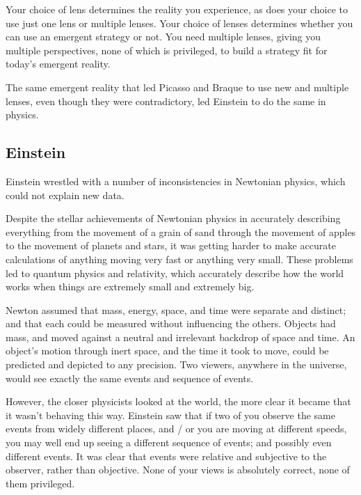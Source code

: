 Your choice of lens determines the reality you experience, as does your choice to use just one lens or multiple lenses. Your choice of lenses determines whether you can use an emergent strategy or not. You need multiple lenses, giving you multiple perspectives, none of which is privileged, to build a strategy fit for today's emergent reality.


The same emergent reality that led Picasso and Braque  to use new and multiple lenses, even though they were contradictory, led Einstein to do the same in physics.


\subsection{Einstein}
Einstein wrestled with a number of inconsistencies in Newtonian physics, which could not explain new data.


Despite the stellar achievements of Newtonian physics in accurately describing everything from the movement of a grain of sand through the movement of apples to the movement of planets and stars, it was getting harder to make accurate calculations of anything moving very fast or anything very small. These problems led to quantum physics and relativity, which accurately describe how the world works when things are extremely small and extremely big.


Newton assumed that mass, energy, space, and time were separate and distinct; and that each could be measured without influencing the others\cite{newton-principia}. Objects had mass, and moved against a neutral and irrelevant backdrop of space and time. An object's motion through inert space, and the time it took to move, could be predicted and depicted to any precision. Two viewers, anywhere in the universe, would see exactly the same events and sequence of events.


However, the closer physicists looked at the world, the more clear it became that it wasn’t behaving this way. Einstein saw that if two of you observe the same events from widely different places, and / or you are moving at different speeds, you may well end up seeing a different sequence of events; and possibly even different events. It was clear that events were relative and subjective to the observer, rather than objective. None of your views is absolutely correct, none of them privileged. 


